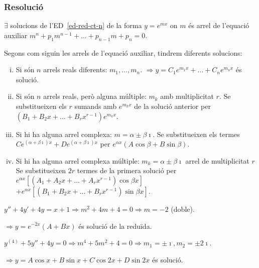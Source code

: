 \subsubsection*{Resolució}
\begin{defi}
	$\exists$ solucions de l'ED~\eqref{ed-red-ct-n} de la forma $y = e^{mx}$ on $m$ és arrel de l'equació auxiliar $m^{n} + p_{1} m^{n-1} + \dots + p_{n-1} m + p_{n} = 0$.
\end{defi}
Segons com siguin les arrels de l'equació auxiliar, tindrem diferents solucions:
\begin{enumerate}[i)]
	\item Si són $n$ arrels reals diferents: $m_{1}, \dots , m_{n}$.
		\subitem $\Rightarrow \boxed{y = C_{1}e^{m_{1}x} + \dots + C_{n}e^{m_{n}x}}$ és solució.
	\item Si són $n$ arrels reals, però alguna múltiple: $m_{k}$ amb multiplicitat $r$.
		\subitem Se substitueixen els $r$ sumands amb $e^{m_{k}x}$ de la solució anterior per
		\subitem $\boxed{(B_{1} + B_{2} x + \dots + B_{r} x^{r-1}) e^{m_{k}x}}$.
	\item Si hi ha alguna arrel complexa: $m = \alpha \pm \beta \imath$.
		\subitem Se substitueixen els termes $C e^{(\alpha + \beta \imath) x} + D e^{(\alpha + \beta \imath) x}$ per $\boxed{e^{\alpha x} (A \cos \beta + B \sin \beta)}$.
	\item Si hi ha alguna arrel complexa múltiple: $m_{k} = \alpha \pm \beta \imath$ arrel de multiplicitat $r$
		\subitem Se substitueixen $2r$ termes de la primera solució per
		\subitem $\boxed{e^{\alpha x} \left[ (A_{1} + A_{2} x + \dots + A_{r} x^{r-1})\cos \beta x \right]}$
		\subitem $+ \boxed{e^{\alpha x} \left[ (B_{1} + B_{2} x + \dots + B_{r} x^{r-1})\sin \beta x \right]}$.
\end{enumerate}

\begin{example}
	$y'' + 4y' + 4y = x + 1 \Rightarrow m^2 + 4m + 4 = 0 \Rightarrow m = -2$ (doble).

	$\Rightarrow \boxed{y = e^{-2x} (A + Bx)}$ és solució de la reduïda.
\end{example}
\begin{example}
	$y^{(4)} + 5y'' + 4y = 0 \Rightarrow m^{4} + 5m^{2} + 4 = 0 \Rightarrow m_{1} = \pm \imath, m_{2} = \pm 2 \imath$.

	$\Rightarrow \boxed{y = A \cos x + B \sin x + C \cos 2x + D \sin 2x}$ és solució.
\end{example}

